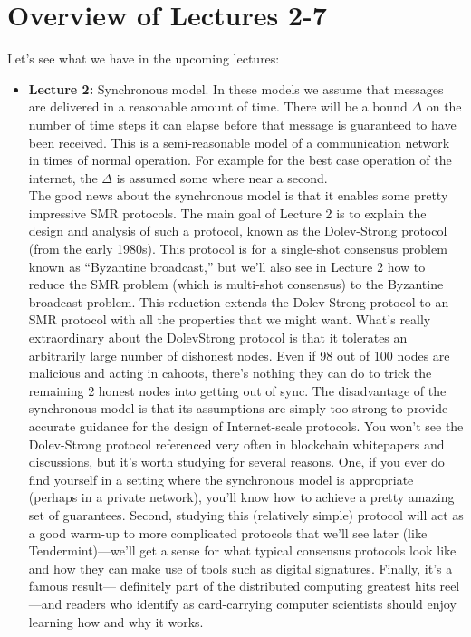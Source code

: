 \chapter*{Overview of Lectures 2-7}
Let's see what we have in the upcoming lectures:\\

\begin{itemize}
    \item \textbf{Lecture 2: }Synchronous model. In these models we assume that messages are delivered in a reasonable amount of time. There will be a bound $\Delta$ on the number of time steps it can elapse before that message is guaranteed to have been received. This is a semi-reasonable model of a communication network in
    times of normal operation. For example for the best case operation of the internet, the $\Delta$ is assumed some where near a second.\\
    The good news about the synchronous model is that it enables some pretty impressive
    SMR protocols. The main goal of Lecture 2 is to explain the design and analysis of such
    a protocol, known as the Dolev-Strong protocol (from the early 1980s). This protocol is
    for a single-shot consensus problem known as “Byzantine broadcast,” but we’ll also see in
    Lecture 2 how to reduce the SMR problem (which is multi-shot consensus) to the Byzantine
    broadcast problem. This reduction extends the Dolev-Strong protocol to an SMR protocol
    with all the properties that we might want. What’s really extraordinary about the DolevStrong protocol is that it tolerates an arbitrarily large number of dishonest nodes. Even if
    98 out of 100 nodes are malicious and acting in cahoots, there’s nothing they can do to trick
    the remaining 2 honest nodes into getting out of sync. The disadvantage of the synchronous
    model is that its assumptions are simply too strong to provide accurate guidance for the
    design of Internet-scale protocols.
    You won’t see the Dolev-Strong protocol referenced very often in blockchain whitepapers
    and discussions, but it’s worth studying for several reasons. One, if you ever do find yourself
    in a setting where the synchronous model is appropriate (perhaps in a private network), you’ll
    know how to achieve a pretty amazing set of guarantees. Second, studying this (relatively
    simple) protocol will act as a good warm-up to more complicated protocols that we’ll see
    later (like Tendermint)—we’ll get a sense for what typical consensus protocols look like and
    how they can make use of tools such as digital signatures. Finally, it’s a famous result—
    definitely part of the distributed computing greatest hits reel—and readers who identify as
    card-carrying computer scientists should enjoy learning how and why it works.


\end{itemize}

